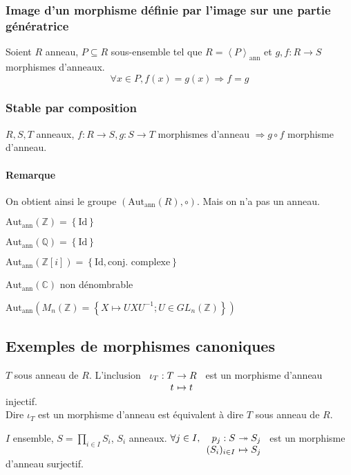 \documentclass[reqno,a4paper,10pt]{report}
\makeatletter
\newcommand{\gen}[1]{\left\langle #1 \right\rangle} %
\newcommand{\set}[1]{\left\lbrace #1 \right\rbrace} %
\newcommand{\IZ}{\ensuremath{\mathbb{Z}}\xspace} %
\newcommand{\IQ}{\ensuremath{\mathbb{Q}}\xspace} %
\newcommand{\IC}{\ensuremath{\mathbb{C}}\xspace} %
\newcommand{\so}{\Rightarrow}
\newcommand{\surj}{\twoheadrightarrow}
\newcommand{\id}{\ensuremath{\mathrm{Id}}} %
\newcommand{\pfootnote}[1]{\up{(}\footnote{#1}\up{)}} %
\newcommand{\Autann}[1]{\text{Aut}_{\text{ann}}\left(#1\right)}
\newcommand{\genann}[1]{\gen{#1}_{\text{ann}}} %
\let\olditemize=\itemize%
\renewenvironment{itemize}{%
    \olditemize%
  }{%
    \@noparlisttrue%
    \endlist%
  }%
\let\oldenumerate=\enumerate%
\renewenvironment{enumerate}{%
    \oldenumerate%
  }{%
    \@noparlisttrue%
    \endlist%
  }%
\makeatother
\begin{document}
\subsubsection{Image d'un morphisme définie par l'image sur une partie
génératrice}
Soient $R$ anneau, $P\subseteq R$ sous-ensemble tel que $R=\genann{P}$
et $g, f : R \to S$ morphismes d'anneaux.
\[\forall x \in P, f(x)=g(x) \so f=g\]

\subsubsection{Stable par composition}
$R, S, T$ anneaux, $f:R \to S, g: S \to T$ morphismes d'anneau $\so g\circ f$
morphisme d'anneau.

\paragraph{Remarque} On obtient ainsi le groupe $(\Autann{R}, \circ)$. Mais on
n'a pas un anneau.
\begin{comment}
  \pfootnote{détails 01/10/09 p1}
\end{comment}
\begin{itemize}
  \item $\Autann{\IZ} = \set{\id}$
  \item $\Autann{\IQ} = \set{\id}$
  \item $\Autann{\IZ[i]} = \set{\id, \text{conj. complexe}}$
  \item $\Autann{\IC}$ non dénombrable
  \item $\Autann{M_n(\IZ)=\set{X \mapsto UXU^{-1};U \in GL_n(\IZ)}}$
\end{itemize}

\subsection{Exemples de morphismes canoniques}
\begin{enumerate}
  \item $T$ sous anneau de $R$. L'inclusion
    $\begin{array}[t]{r@{\ }l}
      \iota_T : T &\to R\\
      t &\mapsto t
    \end{array}$ est un morphisme d'anneau injectif.\\
    Dire $\iota_T$ est un morphisme d'anneau est équivalent à dire $T$ sous
    anneau de $R$.
  \item $I$ ensemble, $S=\prod_{i\in I}S_i$, $S_i$ anneaux.
    $\forall j \in I, \begin{array}[t]{r@{\ }l}
      p_j : S &\surj S_j \\
      (S_i)_{i\in I} &\mapsto S_j
    \end{array}$ est un morphisme d'anneau surjectif.
\end{enumerate}
\end{document}
